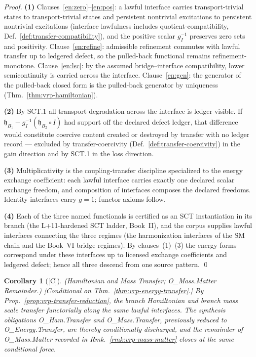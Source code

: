 \documentclass[12pt,oneside]{amsbook}
\theoremstyle{plain}
\newtheorem{corollary}[theorem]{Corollary}
\theoremstyle{definition}
\theoremstyle{remark}
\newcommand{\status}[1]{\textup{[#1]}}
\begin{document}
\begin{proof}
\textbf{(1)}  Clauses~\ref{en:zero}--\ref{en:pos}: a lawful
interface carries transport-trivial states to transport-trivial
states and persistent nontrivial excitations to persistent
nontrivial excitations (interface lawfulness includes
quotient-compatibility, Def.~\ref{def:transfer-compatibility}),
and the positive scalar $g_I^{-1}$ preserves zero sets and
positivity.  Clause~\ref{en:refine}: admissible refinement
commutes with lawful transfer up to ledgered defect, so the
pulled-back functional remains refinement-monotone.
Clause~\ref{en:lsc}: by the assumed bridge--interface
compatibility, lower semicontinuity is carried across the
interface.  Clause~\ref{en:gen}: the generator of the pulled-back
closed form is the pulled-back generator by uniqueness
(Thm.~\ref{thm:vrp-hamiltonian}).

\textbf{(2)}  By SCT.1 all transport degradation across the
interface is ledger-visible.  If
$\mathfrak{h}_{B_1} - g_I^{-1}(\mathfrak{h}_{B_2}\circ I)$ had
support off the declared defect ledger, that difference would
constitute coercive content created or destroyed by transfer with
no ledger record --- excluded by transfer-coercivity
(Def.~\ref{def:transfer-coercivity}) in the gain direction and by
SCT.1 in the loss direction.

\textbf{(3)}  Multiplicativity is the coupling-transfer discipline
specialized to the energy exchange coefficient: each lawful
interface carries exactly one declared scalar exchange freedom,
and composition of interfaces composes the declared freedoms.
Identity interfaces carry $g = 1$; functor axioms follow.

\textbf{(4)}  Each of the three named functionals is certified as
an SCT instantiation in its branch (the L+11-hardened SCT ladder,
Book~II), and the corpus supplies lawful interfaces connecting the
three regimes (the harmonization interfaces of the SM chain and
the Book~VI bridge regimes).  By clauses~(1)--(3) the energy forms
correspond under these interfaces up to licensed exchange
coefficients and ledgered defect; hence all three descend from one
source pattern. \qed
\end{proof}

\begin{corollary}[\status{C}]\label{cor:vrp-ham-mass-transfer}
\textup{(Hamiltonian and Mass Transfer; O\_Mass.Matter Remainder.)}
\textup{[Conditional on Thm.~\ref{thm:vrp-energy-transfer}.]}
By Prop.~\ref{prop:vrp-transfer-reduction}, the branch Hamiltonian
and branch mass scale transfer functorially along the same lawful
interfaces.  The synthesis obligations O\_Ham.Transfer and
O\_Mass.Transfer, previously reduced to O\_Energy.Transfer, are
thereby conditionally discharged, and the remainder of
O\_Mass.Matter recorded in Rmk.~\ref{rmk:vrp-mass-matter} closes
at the same conditional force.
\end{corollary}
\end{document}
